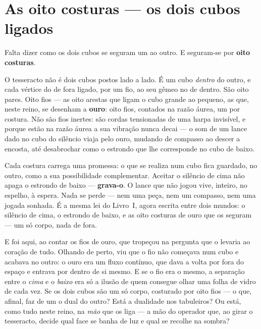 \documentclass[livro.tex]{subfiles}
\begin{document}
\section{As oito costuras --- os dois cubos ligados}

Falta dizer como os dois cubos se seguram um ao outro. E seguram-se por
\textbf{oito costuras}.

\medskip

O tesseracto não é dois cubos postos lado a lado. É um cubo \emph{dentro} do outro, e
cada vértice do de fora ligado, por um fio, ao seu gêmeo no de dentro. São oito pares.
Oito fios --- as oito arestas que ligam o cubo grande ao pequeno, as que, neste reino,
se desenham a \textbf{ouro}: oito fios, contados na razão áurea, um por costura. Não são
fios inertes: são cordas tensionadas de uma harpa invisível, e porque estão na razão
áurea a sua vibração nunca decai --- o som de um lance dado no cubo do silêncio viaja
pelo ouro, mudando de compasso ao descer a encosta, até desabrochar como o estrondo
que lhe corresponde no cubo de baixo.

\medskip

Cada costura carrega uma promessa: o que se realiza num cubo fica guardado, no
outro, como a sua possibilidade complementar. Aceitar o silêncio de cima não apaga o
estrondo de baixo --- \textbf{grava-o}. O lance que \Ben não jogou vive, inteiro,
no espelho, à espera. Nada se perde --- nem uma peça, nem um compasso, nem uma
jogada sonhada. É a mesma lei do Livro~I, agora escrita entre dois mundos: o silêncio
de cima, o estrondo de baixo, e as oito costuras de ouro que os seguram --- um só
corpo, nada de fora.

\medskip

E foi aqui, ao contar os fios de ouro, que \Joa tropeçou na pergunta que o levaria
ao coração de tudo. Olhando de perto, viu que o fio não começava num cubo e acabava no
outro: o ouro era um fluxo contínuo, que dava a volta por fora do espaço e entrava por
dentro de si mesmo. E se o fio era o mesmo, a separação entre o \emph{cima} e o
\emph{baixo} era só a ilusão de quem consegue olhar uma folha de vidro de cada vez. Se os
dois cubos são um só corpo, costurado por oito fios --- o que, afinal, faz de um o dual
do outro? Está a dualidade nos tabuleiros? Ou está, como tudo neste reino, na \emph{mão}
que os liga --- a mão do operador que, ao girar o tesseracto, decide qual face se banha
de luz e qual se recolhe na sombra?

\end{document}
